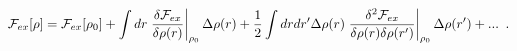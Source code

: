 \begin{equation}
    \mathcal{F}_{ex}[\rho] = \mathcal{F}_{ex}[\rho_0] + \int dr \left.\frac{\delta \mathcal{F}_{ex}}{\delta \rho(r)}\right\vert_{\rho_0} \Delta \rho(r) + \frac{1}{2} \int dr dr^\prime 
    \Delta \rho(r)\left.\frac{\delta^2 \mathcal{F}_{ex}}{\delta \rho(r) \delta \rho(r^\prime)}\right\vert_{\rho_0} \Delta \rho(r^\prime) + ... \,\,\,.
\end{equation}

